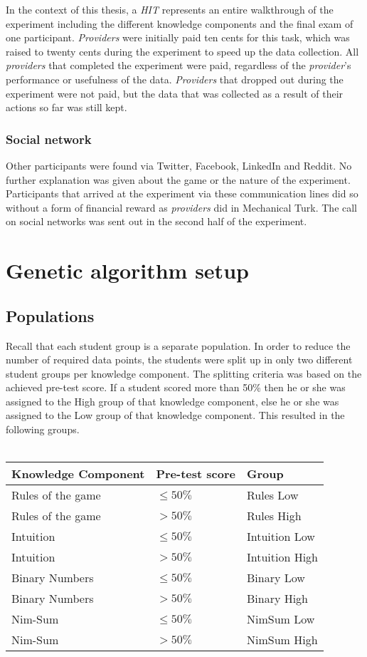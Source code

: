In the context of this thesis, a \emph{HIT} represents an entire walkthrough of
the experiment including the different knowledge components and the final exam
of one participant. \emph{Providers} were initially paid ten cents for this task,
which was raised to twenty cents during the experiment to speed up the data
collection. All \emph{providers} that completed the experiment were paid,
regardless of the \emph{provider}'s performance or usefulness of the data.
\emph{Providers} that dropped out during the experiment were not paid, but the data
that was collected as a result of their actions so far was still kept.
\subsubsection{Social network}
Other participants were found via Twitter, Facebook, LinkedIn and Reddit. No
further explanation was given about the game or the nature of the experiment.
Participants that arrived at the experiment via these communication lines did
so without a form of financial reward as \emph{providers} did in Mechanical
Turk. The call on social networks was sent out in the second half of the
experiment.

\section{Genetic algorithm setup}
\subsection{Populations}
\label{sec:setup_groups}
Recall that each student group is a separate population. In order to reduce the
number of required data points, the students were split up in only two
different student groups per knowledge component. The splitting criteria was
based on the achieved pre-test score. If a student scored more than 50\% then
he or she was assigned to the High group of that knowledge component, else he
or she was assigned to the Low group of that knowledge component. This resulted
in the following groups.\\\\
\begin{tabular}{lll}\hline
	\textbf{Knowledge Component} & \textbf{Pre-test score}    & \textbf{Group} \\\hline
	Rules of the game	& $\leq 50\%$		& Rules Low \\
	Rules of the game	& $> 50\%$			& Rules High \\
	Intuition			& $\leq 50\%$		& Intuition Low \\
	Intuition			& $> 50\%$			& Intuition High \\
	Binary Numbers		& $\leq 50\%$		& Binary Low \\
	Binary Numbers		& $> 50\%$			& Binary High \\
	Nim-Sum				& $\leq 50\%$		& NimSum Low \\
	Nim-Sum				& $> 50\%$			& NimSum High \\
\end{tabular}
